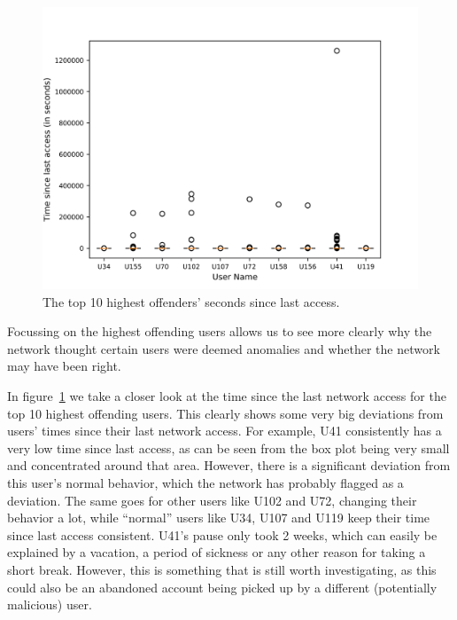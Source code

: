 \begin{figure}
	\begin{center}
		\includegraphics[scale=1.6]{results/highest_offender_time_since_last_access}
	\end{center}
	\caption{The top 10 highest offenders' seconds since last access.~\label{fig:time_since_last_access}}
\end{figure}

Focussing on the highest offending users allows us to see more clearly why the network thought certain users were deemed anomalies and whether the network may have been right.

In figure~\ref{fig:time_since_last_access} we take a closer look at the time since the last network access for the top 10 highest offending users. This clearly shows some very big deviations from users' times since their last network access. For example, U41 consistently has a very low time since last access, as can be seen from the box plot being very small and concentrated around that area. However, there is a significant deviation from this user's normal behavior, which the network has probably flagged as a deviation. The same goes for other users like U102 and U72, changing their behavior a lot, while \enquote{normal} users like U34, U107 and U119 keep their time since last access consistent. U41's pause only took 2 weeks, which can easily be explained by a vacation, a period of sickness or any other reason for taking a short break. However, this is something that is still worth investigating, as this could also be an abandoned account being picked up by a different (potentially malicious) user.

